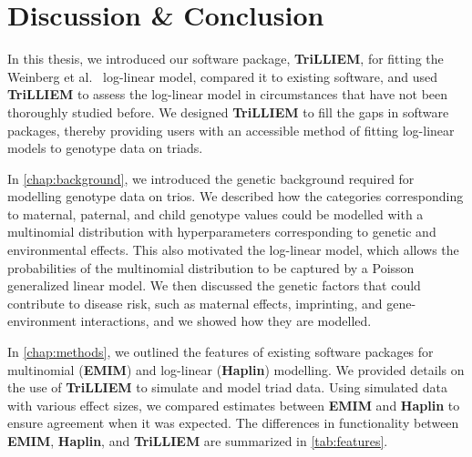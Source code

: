 \chapter{Discussion \& Conclusion}\label{chap:conclusion}

In this thesis, we introduced our software package, \textbf{TriLLIEM}, for fitting the Weinberg et al.~\cite{Wein+98} log-linear model, compared it to existing software, and used \textbf{TriLLIEM} to assess the log-linear model in circumstances that have not been thoroughly studied before.
We designed \textbf{TriLLIEM} to fill the gaps in software packages, thereby providing users with an accessible method of fitting log-linear models to genotype data on triads.

In \cref{chap:background}, we introduced the genetic background required for modelling genotype data on trios.
We described how the categories corresponding to maternal, paternal, and child genotype values could be modelled with a multinomial distribution with hyperparameters corresponding to genetic and environmental effects.
This also motivated the log-linear model, which allows the probabilities of the multinomial distribution to be captured by a Poisson generalized linear model.
We then discussed the genetic factors that could contribute to disease risk, such as maternal effects, imprinting, and gene-environment interactions, and we showed how they are modelled.

In \cref{chap:methods}, we outlined the features of existing software packages for multinomial (\textbf{EMIM}) and log-linear (\textbf{Haplin}) modelling.
We provided details on the use of \textbf{TriLLIEM} to simulate and model triad data.
Using simulated data with various effect sizes, we compared estimates between \textbf{EMIM} and \textbf{Haplin} to ensure agreement when it was expected.
The differences in functionality between \textbf{EMIM}, \textbf{Haplin}, and \textbf{TriLLIEM} are summarized in \cref{tab:features}.

